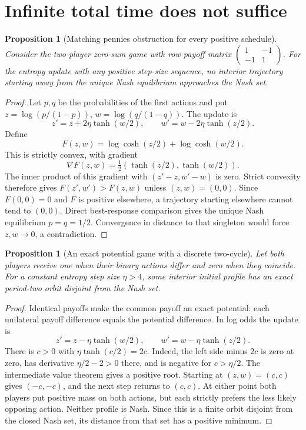 \documentclass[11pt]{article}
\newtheorem{proposition}[theorem]{Proposition}
\theoremstyle{definition}
\begin{document}
\section*{Infinite total time does not suffice}
\begin{proposition}[Matching pennies obstruction for every positive schedule]
Consider the two-player zero-sum game with row payoff matrix
$\left(\begin{smallmatrix}1&-1\\-1&1\end{smallmatrix}\right)$.
For the entropy update with any positive step-size sequence, no interior trajectory starting away from the unique Nash equilibrium approaches the Nash set.
\end{proposition}
\begin{proof}
Let $p,q$ be the probabilities of the first actions and put
$z=\log(p/(1-p))$, $w=\log(q/(1-q))$. The update is
\[
 z'=z+2\eta\tanh(w/2),\qquad
 w'=w-2\eta\tanh(z/2).
\]
Define
\[F(z,w)=\log\cosh(z/2)+\log\cosh(w/2).\]
This is strictly convex, with gradient
\[\nabla F(z,w)=\tfrac12(\tanh(z/2),\tanh(w/2)).\]
The inner product of this gradient with $(z'-z,w'-w)$ is zero. Strict convexity therefore gives $F(z',w')>F(z,w)$ unless $(z,w)=(0,0)$. Since $F(0,0)=0$ and $F$ is positive elsewhere, a trajectory starting elsewhere cannot tend to $(0,0)$. Direct best-response comparison gives the unique Nash equilibrium $p=q=1/2$. Convergence in distance to that singleton would force $z,w\to0$, a contradiction.
\end{proof}

\begin{proposition}[An exact potential game with a discrete two-cycle]
Let both players receive one when their binary actions differ and zero when they coincide. For a constant entropy step size $\eta>4$, some interior initial profile has an exact period-two orbit disjoint from the Nash set.
\end{proposition}
\begin{proof}
Identical payoffs make the common payoff an exact potential: each unilateral payoff difference equals the potential difference. In log odds the update is
\[
 z'=z-\eta\tanh(w/2),\qquad
 w'=w-\eta\tanh(z/2).
\]
There is $c>0$ with $\eta\tanh(c/2)=2c$. Indeed, the left side minus $2c$ is zero at zero, has derivative $\eta/2-2>0$ there, and is negative for $c>\eta/2$. The intermediate value theorem gives a positive root. Starting at $(z,w)=(c,c)$ gives $(-c,-c)$, and the next step returns to $(c,c)$. At either point both players put positive mass on both actions, but each strictly prefers the less likely opposing action. Neither profile is Nash. Since this is a finite orbit disjoint from the closed Nash set, its distance from that set has a positive minimum.
\end{proof}
\end{document}
